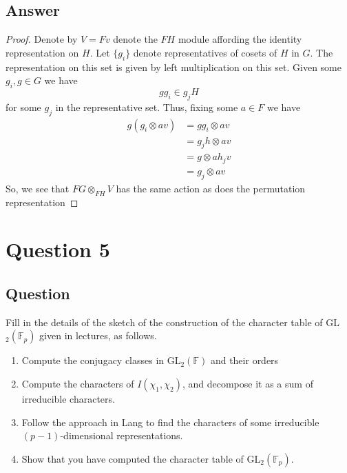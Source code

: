 \documentclass[11pt]{article}
\begin{document}
\subsection{Answer}
\begin{proof}
Denote by $V = Fv $ denote the $FH$ module affording the identity representation on $H$. Let  $\{ g_i\}$ denote representatives of cosets of  $H$ in $G$. The representation on this set is given by left multiplication on this set. Given some $g_i , g \in G$ we have 
\[g g_i \in g_j H \]
for some $g_j$ in the representative set. Thus, fixing some $a \in F$ we have
\begin{align*}
g( g_i \otimes a v)  &= g g_i \otimes a v\\
&= g_ j h \otimes a v\\
&= g \otimes a h_j v \\
&= g_j \otimes av 
\end{align*}
So, we see that $FG \otimes_{FH} V $ has the same action as does the permutation representation
\end{proof}
\section{Question 5}
\subsection{Question}
Fill in the details of the sketch of the construction of the character table of GL$_2(\mathbb{F}_p)$ given in lectures, as follows.
\begin{enumerate}
\item Compute the conjugacy classes in GL$_2(\mathbb{F})$ and their orders
\item Compute the characters of $I(\chi_1,\chi_2)$, and decompose it as a sum of irreducible characters.
\item Follow the approach in Lang to find the characters of some irreducible $(p-1)$-dimensional representations.
\item Show that you have computed the character table of GL$_2(\mathbb{F}_p)$.
\end{enumerate}
\end{document}
